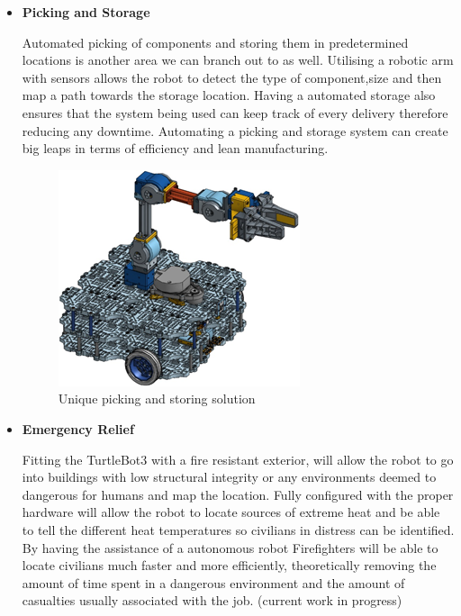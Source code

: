 \documentclass[12pt]{report}
\begin{document}
\begin{itemize}
    \item \textbf{Picking and Storage}\par
    Automated picking of components and storing them in predetermined locations is another area we can branch out to as well. Utilising a robotic arm with sensors allows the robot to detect the type of component,size and then map a path towards the storage location. Having a automated storage also ensures that the system being used can keep track of every delivery therefore reducing any downtime. Automating a picking and storage system can create big leaps in terms of efficiency and lean manufacturing.\par
    \begin{figure}[H]
        \centering
        \includegraphics{Fig2.png}
        \caption{Unique picking and storing solution}
        \label{fig:2}
    \end{figure}
    
    \item \textbf{Emergency Relief}\par
    Fitting the TurtleBot3 with a fire resistant exterior, will allow the robot to go into buildings with low structural integrity or any environments deemed to dangerous for humans and map the location. Fully configured with the proper hardware will allow the robot to locate sources of extreme heat and be able to tell the different heat temperatures so civilians in distress can be identified. By having the assistance of a autonomous robot Firefighters will be able to locate civilians much faster and more efficiently, theoretically removing the amount of time spent in a dangerous environment and the amount of casualties usually associated with the job. (current work in progress)\par
    
\end{itemize}
\end{document}
